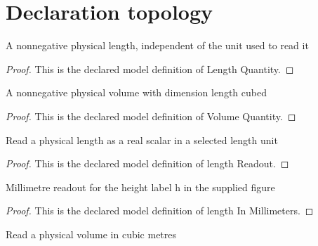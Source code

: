 \section{Declaration topology}
\begin{definition}
  \label{def:physics:phyx-mini-0365:phyxminiproblems-problemphyxmini0365-lengthquantity}
  A nonnegative physical length, independent of the unit used to read it
\end{definition}
\begin{proof}
  This is the declared model definition of Length Quantity.
\end{proof}
\begin{definition}
  \label{def:physics:phyx-mini-0365:phyxminiproblems-problemphyxmini0365-volumequantity}
  A nonnegative physical volume with dimension length cubed
\end{definition}
\begin{proof}
  This is the declared model definition of Volume Quantity.
\end{proof}
\begin{definition}
  \label{def:physics:phyx-mini-0365:phyxminiproblems-problemphyxmini0365-lengthreadout}
  Read a physical length as a real scalar in a selected length unit
\end{definition}
\begin{proof}
  This is the declared model definition of length Readout.
\end{proof}
\begin{definition}
  \label{def:physics:phyx-mini-0365:phyxminiproblems-problemphyxmini0365-lengthinmillimeters}
  Millimetre readout for the height label h in the supplied figure
\end{definition}
\begin{proof}
  This is the declared model definition of length In Millimeters.
\end{proof}
\begin{definition}
  \label{def:physics:phyx-mini-0365:phyxminiproblems-problemphyxmini0365-volumeincubicmeters}
  Read a physical volume in cubic metres
\end{definition}
